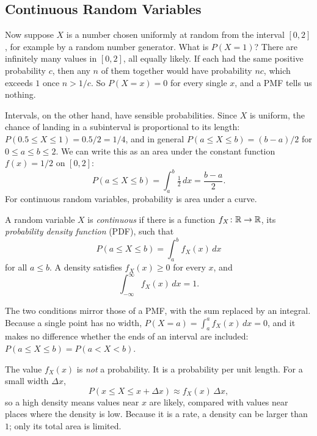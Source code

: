 \subsection{Continuous Random Variables}
\label{sec:ch05-continuous}

Now suppose $X$ is a number chosen uniformly at random from the interval
$[0, 2]$, for example by a random number generator. What is $P(X = 1)$?
There are infinitely many values in $[0, 2]$, all equally likely. If each
had the same positive probability $c$, then any $n$ of them together
would have probability $nc$, which exceeds $1$ once $n > 1/c$. So
$P(X = x) = 0$ for every single $x$, and a PMF tells us nothing.

Intervals, on the other hand, have sensible probabilities. Since $X$ is
uniform, the chance of landing in a subinterval is proportional to its
length: $P(0.5 \le X \le 1) = 0.5/2 = 1/4$, and in general
$P(a \le X \le b) = (b - a)/2$ for $0 \le a \le b \le 2$. We can write
this as an area under the constant function $f(x) = 1/2$ on $[0, 2]$:
\[
  P(a \le X \le b) = \int_a^b \tfrac12 \, dx = \frac{b - a}{2} .
\]
For continuous random variables, probability is area under a curve.

\begin{definition}
  \label{def:pdf}
  A random variable $X$ is \emph{continuous} if there is a function
  $f_X\colon \mathbb{R} \to \mathbb{R}$, its \emph{probability density function} (PDF),
  such that
  \[
    P(a \le X \le b) = \int_a^b f_X(x)\, dx
  \]
  for all $a \le b$. A density satisfies $f_X(x) \ge 0$ for every $x$,
  and
  \[
    \int_{-\infty}^{\infty} f_X(x)\, dx = 1 .
  \]
\end{definition}

The two conditions mirror those of a PMF, with the sum replaced by an
integral. Because a single point has no width, $P(X = a) =
\int_a^a f_X(x)\,dx = 0$, and it makes no difference whether the ends of
an interval are included: $P(a \le X \le b) = P(a < X < b)$.

The value $f_X(x)$ is \emph{not} a probability. It is a probability per
unit length. For a small width $\Delta x$,
\[
  P(x \le X \le x + \Delta x) \approx f_X(x)\, \Delta x ,
\]
so a high density means values near $x$ are likely, compared with
values near places where the density is low. Because it is a rate, a
density can be larger than $1$; only its total area is limited.

